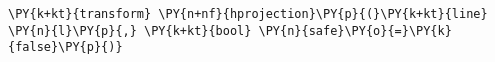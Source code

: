 \begin{Verbatim}[commandchars=\\\{\}]
    \PY{k+kt}{transform} \PY{n+nf}{hprojection}\PY{p}{(}\PY{k+kt}{line} \PY{n}{l}\PY{p}{,} \PY{k+kt}{bool} \PY{n}{safe}\PY{o}{=}\PY{k}{false}\PY{p}{)}
\end{Verbatim}
